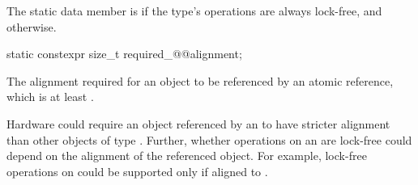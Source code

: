 \begin{itemdescr}
\pnum
The static data member  is 
if the  type's operations are always lock-free,
and  otherwise.
\end{itemdescr}

\begin{itemdecl}
static constexpr size_t required_@@alignment;
\end{itemdecl}

\begin{itemdescr}
\pnum
The alignment required for an object to be referenced  by an atomic reference,
which is at least . 

\pnum
\begin{note}
Hardware could require an object
referenced by an 
to have stricter alignment
than other objects of type .
Further, whether operations on an 
are lock-free could depend on the alignment of the referenced object.
For example, lock-free operations on 
could be supported only if aligned to .
\end{note}
\end{itemdescr}


